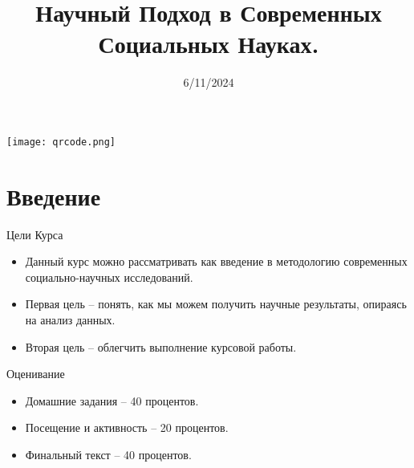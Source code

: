 \documentclass{beamer}
\title[]{\textbf{\Large{
Научный Подход в Современных Социальных Науках.}}}
\author[]{%
  \texorpdfstring{%
    \begin{columns}
      \column{.3333\linewidth}
      \centering
      \large{}
      \column{.40\linewidth}
      \centering
      \large{Евгений Седашов, PhD} \\
      \small{esedashov@hse.ru}
      \column{.3333\linewidth}
      \centering
      \large{}
    \end{columns}
 }
 {Author 1, Author 2, Author 3}
}
\date{6/11/2024}
\begin{document}
 
\makeatletter
\let\beamer@old@writeslidentry\beamer@writeslidentry
\newcommand\bulletoff{\let\beamer@writeslidentry\relax}
\newcommand\bulleton{\let\beamer@writeslidentry\beamer@old@writeslidentry}
\large
{}
\begin{frame}
  \titlepage
\end{frame}
\begin{frame}
  \texttt{[image: qrcode.png]}
\end{frame}
\section{Введение}
\begin{frame}{Цели Курса}
\begin{itemize}
	\setlength\itemsep{2em}
	\item Данный курс можно рассматривать как введение в методологию современных социально-научных исследований.
	\item Первая цель -- понять,  как мы можем получить научные результаты,  опираясь на анализ данных. 
	\item Вторая цель -- облегчить выполнение курсовой работы. 
\end{itemize}
\end{frame}
\begin{frame}{Оценивание}
\begin{itemize}
	\setlength\itemsep{2em}
	\item Домашние задания -- 40 процентов.
	\item Посещение и активность -- 20 процентов.
	\item Финальный текст -- 40 процентов. 
\end{itemize}
\end{frame}
\end{document}
